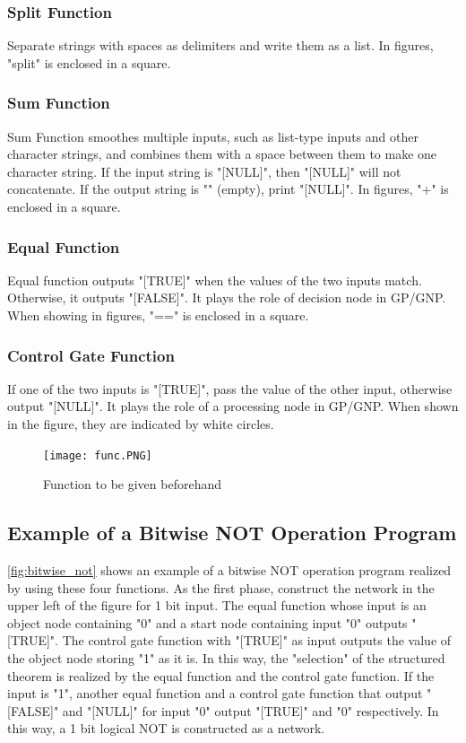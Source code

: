 \documentclass{article}
\begin{document}
\subsubsection{Split Function}
Separate strings with spaces as delimiters and write them as a list.
In figures, "split" is enclosed in a square.

\subsubsection{Sum Function}
Sum Function smoothes multiple inputs, such as list-type inputs and other character strings, and combines them with a space between them to make one character string.
If the input string is "[NULL]", then "[NULL]" will not concatenate.
If the output string is "" (empty), print "[NULL]".
In figures, "+" is enclosed in a square.

\subsubsection {Equal Function}
Equal function outputs "[TRUE]" when the values of the two inputs match.
Otherwise, it outputs "[FALSE]".
It plays the role of decision node in GP/GNP.
When showing in figures, "==" is enclosed in a square.

\subsubsection {Control Gate Function}
If one of the two inputs is "[TRUE]", pass the value of the other input, otherwise output "[NULL]".
It plays the role of a processing node in GP/GNP.
When shown in the figure, they are indicated by white circles.



\begin{figure}[t]
\begin{center}
\texttt{[image: func.PNG]}
\end{center}
\caption {Function to be given beforehand}
\label{fig:func}
\end{figure}

\subsection {Example of a Bitwise NOT Operation Program}
\ref{fig:bitwise_not} shows an example of a bitwise NOT operation program realized by using these four functions.
As the first phase, construct the network in the upper left of the figure for 1 bit input.
The equal function whose input is an object node containing "0" and a start node containing input "0" outputs "[TRUE]".
The control gate function with "[TRUE]" as input outputs the value of the object node storing "1" as it is.
In this way, the "selection" of the structured theorem is realized by the equal function and the control gate function.
If the input is "1", another equal function and a control gate function that output "[FALSE]" and "[NULL]" for input "0" output "[TRUE]" and "0" respectively.
In this way, a 1 bit logical NOT is constructed as a network.
\end{document}
